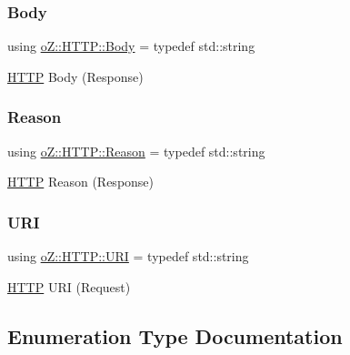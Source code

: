 \subsubsection{\texorpdfstring{Body}{Body}}
{\footnotesize\ttfamily using \mbox{\hyperlink{namespaceo_z_1_1_h_t_t_p_a270c38b9f9b6228ce430fda6d5b150d6}{o\+Z\+::\+H\+T\+T\+P\+::\+Body}} = typedef std\+::string}



\mbox{\hyperlink{namespaceo_z_1_1_h_t_t_p}{H\+T\+TP}} Body (Response) 

\mbox{\label{namespaceo_z_1_1_h_t_t_p_afcd8b91e5e8a7b6df0a7b3b298ec3965}} 
\subsubsection{\texorpdfstring{Reason}{Reason}}
{\footnotesize\ttfamily using \mbox{\hyperlink{namespaceo_z_1_1_h_t_t_p_afcd8b91e5e8a7b6df0a7b3b298ec3965}{o\+Z\+::\+H\+T\+T\+P\+::\+Reason}} = typedef std\+::string}



\mbox{\hyperlink{namespaceo_z_1_1_h_t_t_p}{H\+T\+TP}} Reason (Response) 

\mbox{\label{namespaceo_z_1_1_h_t_t_p_a6d47156e2eac27750983fc1b54bd2ff8}} 
\subsubsection{\texorpdfstring{URI}{URI}}
{\footnotesize\ttfamily using \mbox{\hyperlink{namespaceo_z_1_1_h_t_t_p_a6d47156e2eac27750983fc1b54bd2ff8}{o\+Z\+::\+H\+T\+T\+P\+::\+U\+RI}} = typedef std\+::string}



\mbox{\hyperlink{namespaceo_z_1_1_h_t_t_p}{H\+T\+TP}} U\+RI (Request) 



\subsection{Enumeration Type Documentation}
\mbox{\label{namespaceo_z_1_1_h_t_t_p_acd43703151305f79b1e2f42e98ee8199}} 
